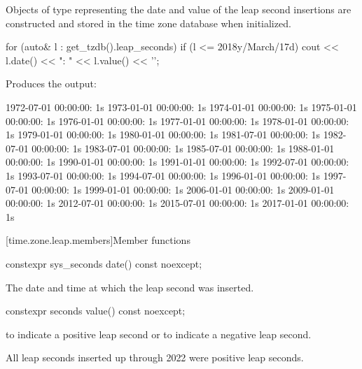 \pnum
Objects of type  representing
the date and value of the leap second insertions
are constructed and stored in the time zone database when initialized.

\pnum
\begin{example}
\begin{codeblock}
for (auto& l : get_tzdb().leap_seconds)
  if (l <= 2018y/March/17d)
    cout << l.date() << ": " << l.value() << '\n';
\end{codeblock}

Produces the output:

\begin{outputblock}
1972-07-01 00:00:00: 1s
1973-01-01 00:00:00: 1s
1974-01-01 00:00:00: 1s
1975-01-01 00:00:00: 1s
1976-01-01 00:00:00: 1s
1977-01-01 00:00:00: 1s
1978-01-01 00:00:00: 1s
1979-01-01 00:00:00: 1s
1980-01-01 00:00:00: 1s
1981-07-01 00:00:00: 1s
1982-07-01 00:00:00: 1s
1983-07-01 00:00:00: 1s
1985-07-01 00:00:00: 1s
1988-01-01 00:00:00: 1s
1990-01-01 00:00:00: 1s
1991-01-01 00:00:00: 1s
1992-07-01 00:00:00: 1s
1993-07-01 00:00:00: 1s
1994-07-01 00:00:00: 1s
1996-01-01 00:00:00: 1s
1997-07-01 00:00:00: 1s
1999-01-01 00:00:00: 1s
2006-01-01 00:00:00: 1s
2009-01-01 00:00:00: 1s
2012-07-01 00:00:00: 1s
2015-07-01 00:00:00: 1s
2017-01-01 00:00:00: 1s
\end{outputblock}
\end{example}

[time.zone.leap.members]{Member functions}

%
\begin{itemdecl}
constexpr sys_seconds date() const noexcept;
\end{itemdecl}

\begin{itemdescr}
\pnum
\returns
The date and time at which the leap second was inserted.
\end{itemdescr}

%
\begin{itemdecl}
constexpr seconds value() const noexcept;
\end{itemdecl}

\begin{itemdescr}
\pnum
\returns
{} to indicate a positive leap second or
 to indicate a negative leap second.
\begin{note}
All leap seconds inserted up through 2022 were positive leap seconds.
\end{note}
\end{itemdescr}

